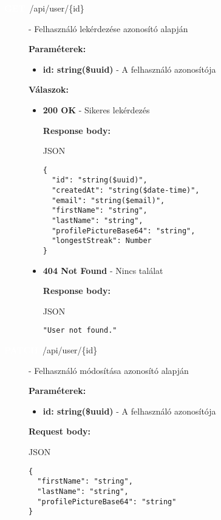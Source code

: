 \documentclass[12pt]{report}
\newcommand{\httpGet}[1]{\colorbox{getColor}{\textbf{\textcolor{white}{GET}}}~#1}
\newcommand{\httpPatch}[1]{\colorbox{patchColor}{\textbf{\textcolor{white}{PATCH}}}~#1}
\begin{document}
\begin{description}
  \item[\httpGet{/api/user/\{id\}}] - Felhasználó lekérdezése azonosító alapján

    \vspace{0.5cm}
    \textbf{Paraméterek:}
    \begin{itemize}
      \item \textbf{id: string(\$uuid)} - A felhasználó azonosítója
    \end{itemize}

    \vspace{0.5cm}
    \textbf{Válaszok:}
    \begin{itemize}
      \item \textbf{200 OK} - Sikeres lekérdezés

        \textbf{Response body:}
        \begin{codeblock}{JSON}
          \begin{verbatim}
{
  "id": "string($uuid)",
  "createdAt": "string($date-time)",
  "email": "string($email)",
  "firstName": "string",
  "lastName": "string",
  "profilePictureBase64": "string",
  "longestStreak": Number
}
          \end{verbatim}
        \end{codeblock}
      \item \textbf{404 Not Found} - Nincs találat

        \textbf{Response body:}
        \begin{codeblock}{JSON}
          \begin{verbatim}
"User not found."
          \end{verbatim}
        \end{codeblock}
    \end{itemize}

    \item[\httpPatch{/api/user/\{id\}}] - Felhasználó módosítása azonosító alapján

    \vspace{0.5cm}
    \textbf{Paraméterek:}
    \begin{itemize}
      \item \textbf{id: string(\$uuid)} - A felhasználó azonosítója
    \end{itemize}

    \vspace{0.5cm}
    \textbf{Request body:}
    \begin{codeblock}{JSON}
      \begin{verbatim}
{
  "firstName": "string",
  "lastName": "string",
  "profilePictureBase64": "string"
}
      \end{verbatim}
    \end{codeblock}


\end{description}
\end{document}
